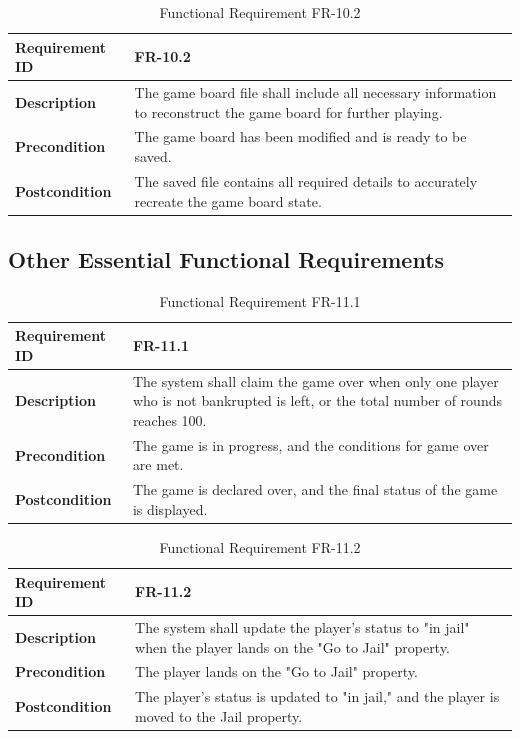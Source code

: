\documentclass{article}
\begin{document}
\begin{table}[ht]
    \centering
    \caption{Functional Requirement FR-10.2}
    \begin{tabular}{@{}P{3cm}P{12cm}@{}}
        \toprule
        \textbf{Requirement ID} & FR-10.2 \\ \midrule
        \textbf{Description} & The game board file shall include all necessary information to reconstruct the game board for further playing. \\ \midrule
        \textbf{Precondition} & The game board has been modified and is ready to be saved. \\ \midrule
        \textbf{Postcondition} & The saved file contains all required details to accurately recreate the game board state. \\ \bottomrule
    \end{tabular}
\end{table}

\subsection{Other Essential Functional Requirements}

\begin{table}[ht]
    \centering
    \caption{Functional Requirement FR-11.1}
    \begin{tabular}{@{}P{3cm}P{12cm}@{}}
        \toprule
        \textbf{Requirement ID} & FR-11.1 \\ \midrule
        \textbf{Description} & The system shall claim the game over when only one player who is not bankrupted is left, or the total number of rounds reaches 100. \\ \midrule
        \textbf{Precondition} & The game is in progress, and the conditions for game over are met. \\ \midrule
        \textbf{Postcondition} & The game is declared over, and the final status of the game is displayed. \\ \bottomrule
    \end{tabular}
\end{table}

\begin{table}[ht]
    \centering
    \caption{Functional Requirement FR-11.2}
    \begin{tabular}{@{}P{3cm}P{12cm}@{}}
        \toprule
        \textbf{Requirement ID} & FR-11.2 \\ \midrule
        \textbf{Description} & The system shall update the player's status to "in jail" when the player lands on the "Go to Jail" property. \\ \midrule
        \textbf{Precondition} & The player lands on the "Go to Jail" property. \\ \midrule
        \textbf{Postcondition} & The player's status is updated to "in jail," and the player is moved to the Jail property. \\ \bottomrule
    \end{tabular}
\end{table}
\end{document}
